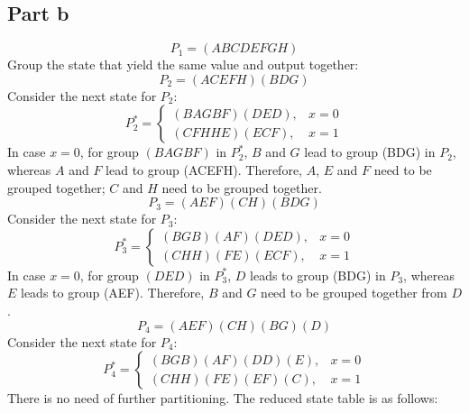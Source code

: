 \documentclass[12pt, a4paper]{article}
\begin{document}
	\subsection*{Part b}
	$$P_1 = (ABCDEFGH)$$
	Group the state that yield the same value and output together:
	$$P_2 = (ACEFH)(BDG)$$
	Consider the next state for $P_2$:
	\[
		P_2^* =
		\left.
		\begin{cases}
			(BAGBF)(DED), & x = 0 \\
			(CFHHE)(ECF), & x = 1
		\end{cases}
		\right.
	\]
	In case $x = 0$, for group $(BAGBF)$ in $P_2^*$, $B$ and $G$ lead to group (BDG) in $P_2$, whereas $A$ and $F$ lead to group (ACEFH). Therefore, $A$, $E$ and $F$ need to be grouped together; $C$ and $H$ need to be grouped together.
	$$P_3 = (AEF)(CH)(BDG)$$
	Consider the next state for $P_3$:
	\[
		P_3^* =
		\left.
		\begin{cases}
			(BGB)(AF)(DED), & x = 0 \\
			(CHH)(FE)(ECF), & x = 1
		\end{cases}
		\right.
	\]
	In case $x = 0$, for group $(DED)$ in $P_3^*$, $D$ leads to group (BDG) in $P_3$, whereas $E$ leads to group (AEF). Therefore, $B$ and $G$ need to be grouped together from $D$.
	$$P_4 = (AEF)(CH)(BG)(D)$$
	Consider the next state for $P_4$:
	\[
		P_4^* =
		\left.
		\begin{cases}
			(BGB)(AF)(DD)(E), & x = 0 \\
			(CHH)(FE)(EF)(C), & x = 1
		\end{cases}
		\right.
	\]
	There is no need of further partitioning. The reduced state table is as follows:
	\begin{center}
	\end{center}
\end{document}
